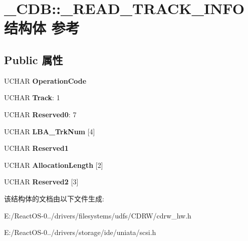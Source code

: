 \hypertarget{struct___c_d_b_1_1___r_e_a_d___t_r_a_c_k___i_n_f_o}{}\section{\+\_\+\+C\+DB\+:\+:\+\_\+\+R\+E\+A\+D\+\_\+\+T\+R\+A\+C\+K\+\_\+\+I\+N\+F\+O结构体 参考}
\label{struct___c_d_b_1_1___r_e_a_d___t_r_a_c_k___i_n_f_o}
\subsection*{Public 属性}
\begin{DoxyCompactItemize}
\item 
\mbox{\label{struct___c_d_b_1_1___r_e_a_d___t_r_a_c_k___i_n_f_o_aa3d7ec1bf65741f3f3a1bd7ced2eea72}} 
U\+C\+H\+AR {\bfseries Operation\+Code}
\item 
\mbox{\label{struct___c_d_b_1_1___r_e_a_d___t_r_a_c_k___i_n_f_o_a4be56ac7f85493b6e829dd6681030d1e}} 
U\+C\+H\+AR {\bfseries Track}\+: 1
\item 
\mbox{\label{struct___c_d_b_1_1___r_e_a_d___t_r_a_c_k___i_n_f_o_aa16ae662b8b66032b970dd023f946986}} 
U\+C\+H\+AR {\bfseries Reserved0}\+: 7
\item 
\mbox{\label{struct___c_d_b_1_1___r_e_a_d___t_r_a_c_k___i_n_f_o_adefea9302acb6737bedda4e36d5e8d3e}} 
U\+C\+H\+AR {\bfseries L\+B\+A\+\_\+\+Trk\+Num} \mbox{[}4\mbox{]}
\item 
\mbox{\label{struct___c_d_b_1_1___r_e_a_d___t_r_a_c_k___i_n_f_o_af44b7497842d83bd09d794c5f88b11b8}} 
U\+C\+H\+AR {\bfseries Reserved1}
\item 
\mbox{\label{struct___c_d_b_1_1___r_e_a_d___t_r_a_c_k___i_n_f_o_a0e4edf1b30fd07371eecc081e582a802}} 
U\+C\+H\+AR {\bfseries Allocation\+Length} \mbox{[}2\mbox{]}
\item 
\mbox{\label{struct___c_d_b_1_1___r_e_a_d___t_r_a_c_k___i_n_f_o_a58378f0ded26769b3a684df62a8c5ceb}} 
U\+C\+H\+AR {\bfseries Reserved2} \mbox{[}3\mbox{]}
\end{DoxyCompactItemize}


该结构体的文档由以下文件生成\+:\begin{DoxyCompactItemize}
\item 
E\+:/\+React\+O\+S-\/0../drivers/filesystems/udfs/\+C\+D\+R\+W/cdrw\+\_\+hw.\+h\item 
E\+:/\+React\+O\+S-\/0../drivers/storage/ide/uniata/scsi.\+h\end{DoxyCompactItemize}

